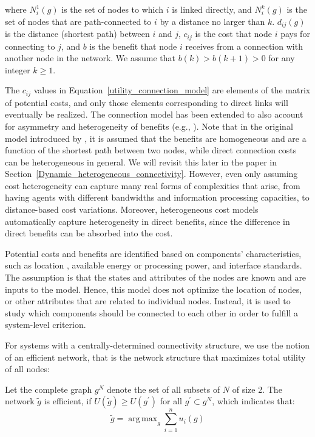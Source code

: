 \documentclass[journal,onecolumn]{IEEEtran}
\theoremstyle{plain}
\DeclareMathOperator*{\argmax}{arg\,max}
\begin{document}
where $N^1_i(g)$ is the set of nodes to which $i$ is linked directly, and $N^k_i(g)$ is the set of nodes that are path-connected to $i$ by a distance no larger than $k$. $d_{ij}(g)$ is the distance (shortest path) between $i$ and $j$, $c_{ij}$ is the cost that node $i$ pays for connecting to $j$, and $b$ is the benefit that node $i$ receives from a connection with another node in the network. We assume that $b(k)>b(k+1)>0$ for any integer $k \geq 1$. 

The $c_{ij}$ values in Equation~\ref{utility_connection_model} are elements of the matrix of potential costs, and only those elements corresponding to direct links will eventually be realized. The connection model has been extended to also account for asymmetry and heterogeneity of benefits (e.g., \cite{persitz2010core}). Note that in the original model introduced by \cite{jackson1996strategic}, it is assumed that the benefits are homogeneous and are a function of the shortest path between two nodes, while direct connection costs can be heterogeneous in general.   We will revisit this later in the paper in Section~\ref{Dynamic_heterogeneous_connectivity}. However, even only assuming cost heterogeneity can capture many real forms of complexities that arise, from having agents with different bandwidths and information processing capacities, to distance-based cost variations. Moreover, heterogeneous cost models automatically capture heterogeneity in direct benefits, since the difference in direct benefits can be absorbed into the cost.

Potential costs and benefits are identified based on components' characteristics, such as location \citep{johnson2003spatial}, available energy or processing power, and interface standards. The assumption is that the states and attributes of the nodes are known and are inputs to the model. Hence, this model does not optimize the location of nodes, or other attributes that are related to individual nodes. Instead, it is used to study which components should be connected to each other in order to fulfill a system-level criterion. 



For systems with a centrally-determined connectivity structure, we use the notion of an efficient network, that is the network structure that maximizes total utility of all nodes: 

Let the complete graph $g^N$ denote the set of all subsets of $N$ of size 2. The network $\tilde{g}$ is efficient, if $U(\tilde{g}) \geq U(g^\prime)$ for all $g^\prime \subset g^N$, which indicates that:
\begin{equation} 
\tilde{g}=\argmax_g\sum_{i=1}^{n}u_i(g)
\end{equation} 
\end{document}
